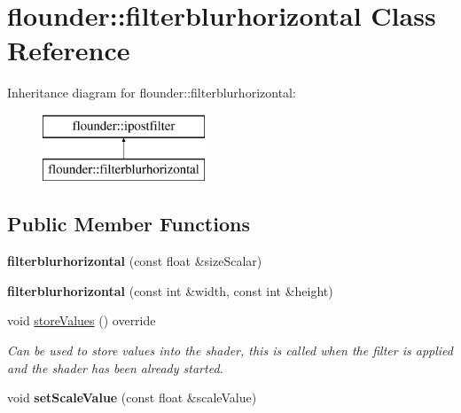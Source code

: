 \hypertarget{classflounder_1_1filterblurhorizontal}{}\section{flounder\+:\+:filterblurhorizontal Class Reference}
\label{classflounder_1_1filterblurhorizontal}
Inheritance diagram for flounder\+:\+:filterblurhorizontal\+:\begin{figure}[H]
\begin{center}
\leavevmode
\includegraphics[height=2.000000cm]{classflounder_1_1filterblurhorizontal}
\end{center}
\end{figure}
\subsection*{Public Member Functions}
\begin{DoxyCompactItemize}
\item 
\mbox{\label{classflounder_1_1filterblurhorizontal_a8a160123b253eb281ce9f8c73d37e95e}} 
{\bfseries filterblurhorizontal} (const float \&size\+Scalar)
\item 
\mbox{\label{classflounder_1_1filterblurhorizontal_ad7f43ae378a048236bf715ba969cece3}} 
{\bfseries filterblurhorizontal} (const int \&width, const int \&height)
\item 
void \hyperlink{classflounder_1_1filterblurhorizontal_ad147fceebdebffd0731fc346370021f7}{store\+Values} () override
\begin{DoxyCompactList}\small\item\em Can be used to store values into the shader, this is called when the filter is applied and the shader has been already started. \end{DoxyCompactList}\item 
\mbox{\label{classflounder_1_1filterblurhorizontal_a2b27fc8a35c15b1b858855c9cc5b9cbd}} 
void {\bfseries set\+Scale\+Value} (const float \&scale\+Value)
\end{DoxyCompactItemize}
